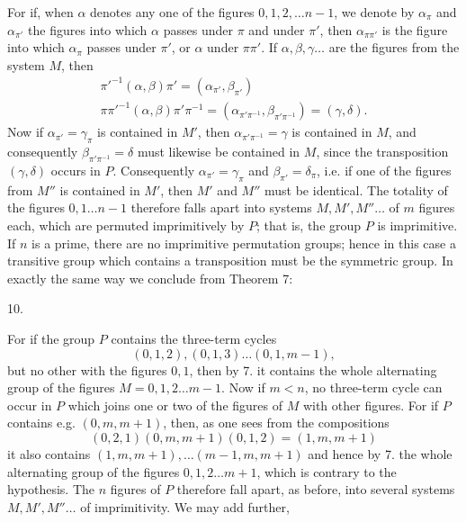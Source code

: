 For if, when $\alpha$ denotes any one of the figures
$0, 1, 2, \ldots n - 1$, we denote by $\alpha_\pi$ and $\alpha_{\pi'}$ the figures into which $\alpha$
passes under $\pi$ and under $\pi'$, then $\alpha_{\pi\pi'}$ is the figure into which $\alpha_\pi$
passes under $\pi'$, or $\alpha$ under $\pi\pi'$. If $\alpha, \beta, \gamma \ldots$ are the figures
from the system $M$, then
\[
\begin{gathered}
\pi'^{-1}(\alpha, \beta) \pi' = (\alpha_{\pi'}, \beta_{\pi'}) \\
\pi\pi'^{-1}(\alpha, \beta) \pi'\pi^{-1} = (\alpha_{\pi'\pi^{-1}}, \beta_{\pi'\pi^{-1}}) = (\gamma, \delta).
\end{gathered}
\]
Now if $\alpha_{\pi'} = \gamma_\pi$ is contained in $M'$, then $\alpha_{\pi'\pi^{-1}} = \gamma$ is contained
in $M$, and consequently $\beta_{\pi'\pi^{-1}} = \delta$ must likewise be contained in $M$,
since the transposition $(\gamma, \delta)$ occurs in $P$. Consequently $\alpha_{\pi'} = \gamma_\pi$
and $\beta_{\pi'} = \delta_\pi$, i.e. if one of the figures from $M''$ is contained in $M'$, then
$M'$ and $M''$ must be identical.
The totality of the figures $0, 1 \ldots n - 1$ therefore falls apart
into systems $M, M', M'' \ldots$ of $m$ figures each, which are permuted imprimitively
by $P$; that is, the group $P$ is imprimitive.
If $n$ is a prime, there are no imprimitive permutation groups;
hence in this case a transitive group which contains a transposition
must be the symmetric group.
In exactly the same way we conclude from Theorem 7:

10. 

For if the group $P$ contains the three-term cycles
\[
(0, 1, 2), (0, 1, 3) \ldots (0, 1, m - 1),
\]
but no other with the figures $0, 1$, then by 7.
it contains the whole alternating group of the figures $M = 0, 1, 2 \ldots m - 1$.
Now if $m < n$, no three-term cycle can occur in $P$ which joins one
or two of the figures of $M$ with other figures. For if $P$ contains
e.g. $(0, m, m + 1)$, then, as one sees from the compositions
\[
(0, 2, 1) (0, m, m + 1) (0, 1, 2) = (1, m, m + 1)
\]
it also contains $(1, m, m + 1), \ldots (m - 1, m, m + 1)$ and hence
by 7. the whole alternating group of the figures $0, 1, 2 \ldots m + 1$,
which is contrary to the hypothesis. The $n$ figures of $P$ therefore
fall apart, as before, into several systems $M, M', M'' \ldots$ of imprimitivity. We may add further,
